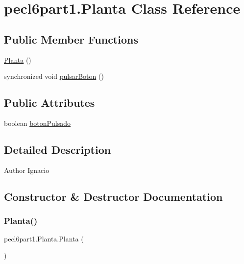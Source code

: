 \hypertarget{classpecl6part1_1_1_planta}{}\section{pecl6part1.\+Planta Class Reference}
\label{classpecl6part1_1_1_planta}
\subsection*{Public Member Functions}
\begin{DoxyCompactItemize}
\item 
\mbox{\hyperlink{classpecl6part1_1_1_planta_a34906192c8f9ba894101f3df3b19044b}{Planta}} ()
\item 
synchronized void \mbox{\hyperlink{classpecl6part1_1_1_planta_a064fad4a92526db34d23f3cd8cbdbee8}{pulsar\+Boton}} ()
\end{DoxyCompactItemize}
\subsection*{Public Attributes}
\begin{DoxyCompactItemize}
\item 
boolean \mbox{\hyperlink{classpecl6part1_1_1_planta_a9ce4c06f0a59be9998b7bf71a1fa94c1}{boton\+Pulsado}}
\end{DoxyCompactItemize}


\subsection{Detailed Description}
\begin{DoxyAuthor}{Author}
Ignacio 
\end{DoxyAuthor}


\subsection{Constructor \& Destructor Documentation}
\mbox{\label{classpecl6part1_1_1_planta_a34906192c8f9ba894101f3df3b19044b}} 
\subsubsection{\texorpdfstring{Planta()}{Planta()}}
{\footnotesize\ttfamily pecl6part1.\+Planta.\+Planta (\begin{DoxyParamCaption}{ }\end{DoxyParamCaption})\hspace{0.3cm}{\ttfamily [inline]}}


